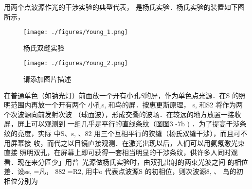 
用两个点波源作光的干涉实验的典型代表， 是杨氏实验．杨氏实验的装置如下图所示，
\begin{figure}[ht]
\centering
\texttt{[image: ./figures/Young\_1.png]}
\caption{杨氏双缝实验} \label{Young_fig1}
\texttt{[image: ./figures/Young\_2.png]}
\caption{请添加图片描述} \label{Young_fig2}
\end{figure}
在普通单色（如钠光灯）前面放一个开有小孔$S$的屏，作为单色点光源．在S 的照明范围内再放一个开有两个
小孔s, 和鸟的屏．按惠更斯原理， s, 和S2 将作为两个次波源向前发射次波
（球面波），形成交叠的波场．在较远的地方放置一接收屏，屏上可以观测到
一组几乎是平行的直线条纹（图图3 -7b ) ．为了提高干涉条纹的亮度，实际
中S、s, 、82 用三个互相平行的狭缝（杨氏双缝干涉），而且可不用屏幕接
收，而代之以目镜直接观测．在激光出现以后，人们可以用氨氖激光束直接
照明双孔，在屏幕上即可获得一套相当明显的干涉条纹，供许多人同时观
看．现在来分匠少」用普~光源做杨氏实验时，由双孔出射的两束光波之间
的相位差．设ss, =凡， 882 =R2, 用中o 代表点波源S 的初相位，则次波源8, 、
鸟的初相位分别为